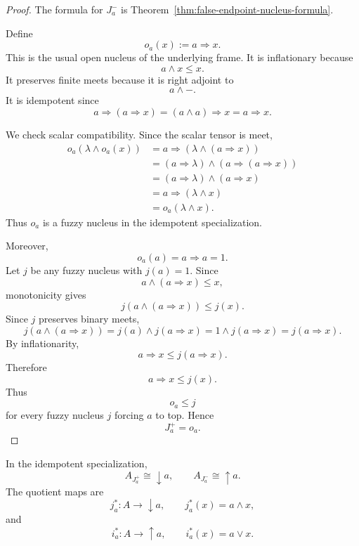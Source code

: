 \begin{proof}
The formula for \(J_a^-\) is Theorem~\ref{thm:false-endpoint-nucleus-formula}.

Define
\[
    o_a(x):=a\Rightarrow x.
\]
This is the usual open nucleus of the underlying frame.  It is inflationary
because
\[
    a\wedge x\leq x.
\]
It preserves finite meets because it is right adjoint to
\[
    a\wedge-.
\]
It is idempotent since
\[
    a\Rightarrow(a\Rightarrow x)
    =
    (a\wedge a)\Rightarrow x
    =
    a\Rightarrow x.
\]

We check scalar compatibility.  Since the scalar tensor is meet,
\[
\begin{aligned}
    o_a(\lambda\wedge o_a(x))
    &=
    a\Rightarrow(\lambda\wedge(a\Rightarrow x))\\
    &=
    (a\Rightarrow\lambda)\wedge(a\Rightarrow(a\Rightarrow x))\\
    &=
    (a\Rightarrow\lambda)\wedge(a\Rightarrow x)\\
    &=
    a\Rightarrow(\lambda\wedge x)\\
    &=
    o_a(\lambda\wedge x).
\end{aligned}
\]
Thus \(o_a\) is a fuzzy nucleus in the idempotent specialization.

Moreover,
\[
    o_a(a)=a\Rightarrow a=1.
\]
Let \(j\) be any fuzzy nucleus with \(j(a)=1\).  Since
\[
    a\wedge(a\Rightarrow x)\leq x,
\]
monotonicity gives
\[
    j(a\wedge(a\Rightarrow x))\leq j(x).
\]
Since \(j\) preserves binary meets,
\[
    j(a\wedge(a\Rightarrow x))
    =
    j(a)\wedge j(a\Rightarrow x)
    =
    1\wedge j(a\Rightarrow x)
    =
    j(a\Rightarrow x).
\]
By inflationarity,
\[
    a\Rightarrow x\leq j(a\Rightarrow x).
\]
Therefore
\[
    a\Rightarrow x\leq j(x).
\]
Thus
\[
    o_a\leq j
\]
for every fuzzy nucleus \(j\) forcing \(a\) to top.  Hence
\[
    J_a^+=o_a.
\]
\end{proof}

\begin{proposition}
\label{prop:idempotent-open-closed-frames}
In the idempotent specialization,
\[
    A_{J_a^+}\cong\downarrow a,
    \qquad
    A_{J_a^-}\cong\uparrow a.
\]
The quotient maps are
\[
    j_a^\ast:A\to\downarrow a,
    \qquad
    j_a^\ast(x)=a\wedge x,
\]
and
\[
    i_a^\ast:A\to\uparrow a,
    \qquad
    i_a^\ast(x)=a\vee x.
\]
\end{proposition}

